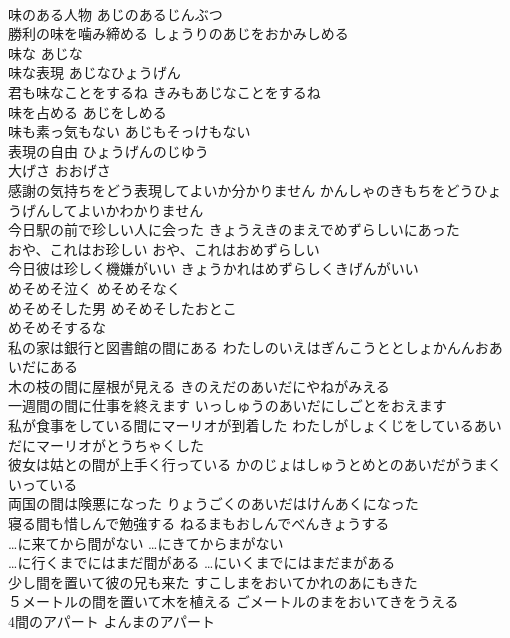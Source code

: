 \documentclass[8pt]{extreport}
\begin{document}
\begin{CJK}{UTF8}{min}
\\	味のある人物	あじのあるじんぶつ	
\\	勝利の味を噛み締める	しょうりのあじをおかみしめる	
\\	味な	あじな	
\\	味な表現	あじなひょうげん	
\\	君も味なことをするね	きみもあじなことをするね	
\\	味を占める	あじをしめる	
\\	味も素っ気もない	あじもそっけもない	
\\	表現の自由	ひょうげんのじゆう	
\\	大げさ	おおげさ	
\\	感謝の気持ちをどう表現してよいか分かりません	かんしゃのきもちをどうひょうげんしてよいかわかりません	
\\	今日駅の前で珍しい人に会った	きょうえきのまえでめずらしいにあった	
\\	おや、これはお珍しい	おや、これはおめずらしい	
\\	今日彼は珍しく機嫌がいい	きょうかれはめずらしくきげんがいい	
\\	めそめそ泣く	めそめそなく	
\\	めそめそした男	めそめそしたおとこ	
\\	めそめそするな		
\\	私の家は銀行と図書館の間にある	わたしのいえはぎんこうととしょかんんおあいだにある	
\\	木の枝の間に屋根が見える	きのえだのあいだにやねがみえる	
\\	一週間の間に仕事を終えます	いっしゅうのあいだにしごとをおえます	
\\	私が食事をしている間にマーリオが到着した	わたしがしょくじをしているあいだにマーリオがとうちゃくした	
\\	彼女は姑との間が上手く行っている	かのじょはしゅうとめとのあいだがうまくいっている	
\\	両国の間は険悪になった	りょうごくのあいだはけんあくになった	
\\	寝る間も惜しんで勉強する	ねるまもおしんでべんきょうする	
\\	…に来てから間がない	…にきてからまがない	
\\	…に行くまでにはまだ間がある	…にいくまでにはまだまがある	
\\	少し間を置いて彼の兄も来た	すこしまをおいてかれのあにもきた	
\\	５メートルの間を置いて木を植える	ごメートルのまをおいてきをうえる	
\\	4間のアパート	よんまのアパート	

\end{CJK}
\end{document}
